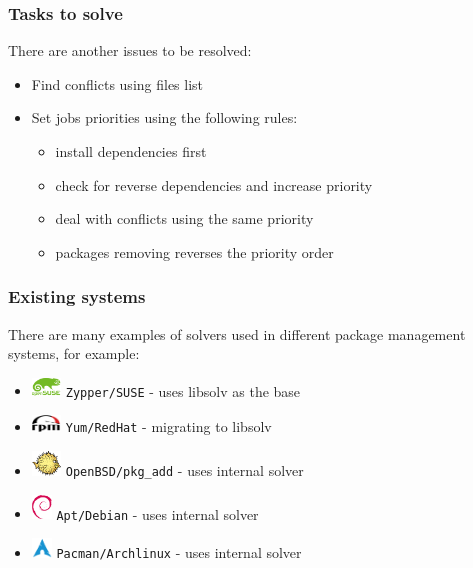 \documentclass{beamer}
\begin{document}
\begin{frame}
\frametitle{Tasks to solve}
There are another issues to be resolved:
\begin{itemize}
  \item Find conflicts using files list
  \item Set jobs priorities using the following rules:
  \begin{itemize}
    \item install dependencies first
    \item check for reverse dependencies and increase priority
    \item deal with conflicts using the same priority
    \item packages removing reverses the priority order
  \end{itemize}
\end{itemize}
\end{frame}

\begin{frame}
\frametitle{Existing systems}

There are many examples of solvers used in different package management systems,
for example:
\begin{itemize}
  \item \includegraphics[width=22pt]{suse.pdf} \hspace{5pt} \texttt{Zypper/SUSE}
  - uses libsolv as the base
  \item \includegraphics[width=22pt]{rpm.pdf} \hspace{5pt} \texttt{Yum/RedHat} -
  migrating to libsolv
  \item \includegraphics[width=22pt]{puf.pdf} \hspace{5pt}
  \texttt{OpenBSD/pkg\_add} - uses internal solver
  \item \includegraphics[width=15pt]{debian.pdf} \hspace{12pt}
  \texttt{Apt/Debian} - uses internal solver
  \item \includegraphics[width=15pt]{arch.pdf} \hspace{12pt}
  \texttt{Pacman/Archlinux} - uses internal solver
\end{itemize}

\end{frame}
\end{document}
